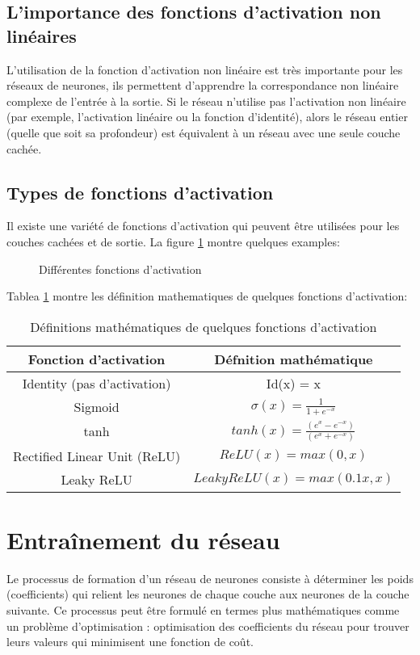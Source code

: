\subsection{L'importance des fonctions d'activation non linéaires}
L'utilisation de la fonction d'activation non linéaire est très importante pour les réseaux de neurones, ils permettent d'apprendre la correspondance non linéaire complexe de l'entrée à la sortie. Si le réseau n'utilise pas l'activation non linéaire (par exemple, l'activation linéaire ou la fonction d'identité), alors le réseau entier (quelle que soit sa profondeur) est équivalent à un réseau avec une seule couche cachée.

\subsection{Types de fonctions d'activation}
Il existe une variété de fonctions d'activation qui peuvent être utilisées pour les couches cachées et de sortie. La figure \ref{fig:activation-function} montre quelques examples:

\begin{figure}[h]
    \centering
	
    \caption{Différentes fonctions d'activation}
    \label{fig:activation-function}
\end{figure}

Tablea \ref{table:activation-functions} montre les définition mathematiques de quelques fonctions d'activation:

\begin{table}[h]
    \centering
    \begin{tabular}{c|c}
        \hline
        Fonction d'activation & Défnition mathématique \\
        \hline
        Identity (pas d'activation) & Id(x) = x \\
        Sigmoid & $\sigma(x)= \frac{1}{1+e^{-x}}$ \\
        tanh & $tanh(x)=\frac{(e^x-e^{-x})}{(e^x+e^{-x})}$\\
        Rectified Linear Unit (ReLU) & $ReLU(x)=max(0,x)$\\
    Leaky ReLU & $LeakyReLU(x)=max(0.1 x,x)$
        
    \end{tabular}
    \caption{Définitions mathématiques de quelques fonctions d'activation}
    \label{table:activation-functions}
\end{table}

\section{Entraînement du réseau}
Le processus de formation d'un réseau de neurones consiste à déterminer les poids (coefficients) qui relient les neurones de chaque couche aux neurones de la couche suivante. Ce processus peut être formulé en termes plus mathématiques comme un problème d'optimisation : optimisation des coefficients du réseau pour trouver leurs valeurs qui minimisent une fonction de coût.

